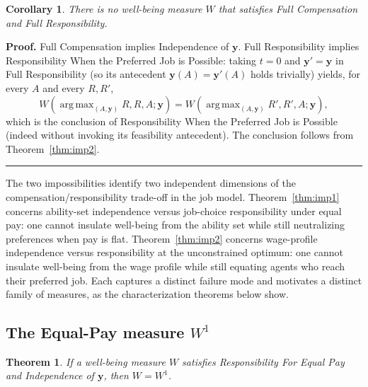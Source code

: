 \documentclass[12pt,thmsb]{article}
\DeclareMathOperator*{\argmax}{arg\,max}
\newtheorem{theorem}{Theorem}
\newtheorem{corollary}{Corollary}
\newenvironment{proof}[1][Proof]{\noindent \textbf{#1.} }{\  \rule{0.5em}{0.5em}}
\begin{document}
\begin{corollary}
\label{cor:imp}
There is no well-being measure $W$ that satisfies Full Compensation and Full
Responsibility.
\end{corollary}

\begin{proof}
Full Compensation implies Independence of $\mathbf y$. Full Responsibility
implies Responsibility When the Preferred Job is Possible: taking $t=0$ and
$\mathbf y'=\mathbf y$ in Full Responsibility (so its antecedent
$\mathbf y(A)=\mathbf y'(A)$ holds trivially) yields, for every $A$ and every
$R,R'$,
\begin{equation*}
W(\argmax_{(A,\mathbf y)}R,R,A;\mathbf y)
=W(\argmax_{(A,\mathbf y)}R',R',A;\mathbf y),
\end{equation*}
which is the conclusion of Responsibility When the Preferred Job is Possible
(indeed without invoking its feasibility antecedent). The conclusion follows
from Theorem~\ref{thm:imp2}.
\end{proof}

The two impossibilities identify two independent dimensions of the
compensation/responsibility trade-off in the job model.
Theorem~\ref{thm:imp1} concerns ability-set independence versus job-choice
responsibility under equal pay: one cannot insulate well-being from the ability
set while still neutralizing preferences when pay is flat.
Theorem~\ref{thm:imp2} concerns wage-profile independence versus responsibility
at the unconstrained optimum: one cannot insulate well-being from the wage
profile while still equating agents who reach their preferred job. Each
captures a distinct failure mode and motivates a distinct family of measures,
as the characterization theorems below show.


\subsection{The Equal-Pay measure $W^1$}

\begin{theorem}
\label{thm:w1}
If a well-being measure $W$ satisfies Responsibility For Equal Pay and
Independence of $\mathbf y$, then $W=W^1$.
\end{theorem}
\end{document}
